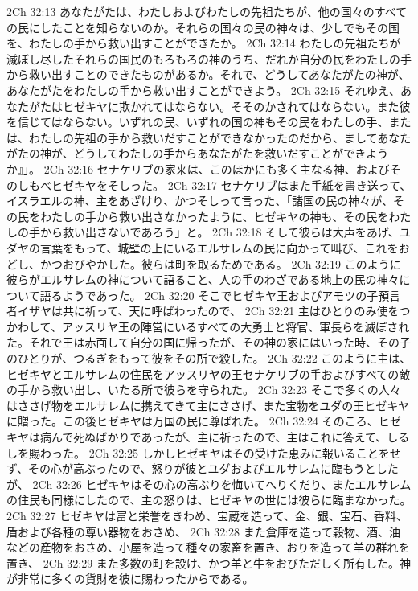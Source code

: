 2Ch 32:13  あなたがたは、わたしおよびわたしの先祖たちが、他の国々のすべての民にしたことを知らないのか。それらの国々の民の神々は、少しでもその国を、わたしの手から救い出すことができたか。
2Ch 32:14  わたしの先祖たちが滅ぼし尽したそれらの国民のもろもろの神のうち、だれか自分の民をわたしの手から救い出すことのできたものがあるか。それで、どうしてあなたがたの神が、あなたがたをわたしの手から救い出すことができよう。
2Ch 32:15  それゆえ、あなたがたはヒゼキヤに欺かれてはならない。そそのかされてはならない。また彼を信じてはならない。いずれの民、いずれの国の神もその民をわたしの手、または、わたしの先祖の手から救いだすことができなかったのだから、ましてあなたがたの神が、どうしてわたしの手からあなたがたを救いだすことができようか』」。
2Ch 32:16  セナケリブの家来は、このほかにも多く主なる神、およびそのしもべヒゼキヤをそしった。
2Ch 32:17  セナケリブはまた手紙を書き送って、イスラエルの神、主をあざけり、かつそしって言った、「諸国の民の神々が、その民をわたしの手から救い出さなかったように、ヒゼキヤの神も、その民をわたしの手から救い出さないであろう」と。
2Ch 32:18  そして彼らは大声をあげ、ユダヤの言葉をもって、城壁の上にいるエルサレムの民に向かって叫び、これをおどし、かつおびやかした。彼らは町を取るためである。
2Ch 32:19  このように彼らがエルサレムの神について語ること、人の手のわざである地上の民の神々について語るようであった。
2Ch 32:20  そこでヒゼキヤ王およびアモツの子預言者イザヤは共に祈って、天に呼ばわったので、
2Ch 32:21  主はひとりのみ使をつかわして、アッスリヤ王の陣営にいるすべての大勇士と将官、軍長らを滅ぼされた。それで王は赤面して自分の国に帰ったが、その神の家にはいった時、その子のひとりが、つるぎをもって彼をその所で殺した。
2Ch 32:22  このように主は、ヒゼキヤとエルサレムの住民をアッスリヤの王セナケリブの手およびすべての敵の手から救い出し、いたる所で彼らを守られた。
2Ch 32:23  そこで多くの人々はささげ物をエルサレムに携えてきて主にささげ、また宝物をユダの王ヒゼキヤに贈った。この後ヒゼキヤは万国の民に尊ばれた。
2Ch 32:24  そのころ、ヒゼキヤは病んで死ぬばかりであったが、主に祈ったので、主はこれに答えて、しるしを賜わった。
2Ch 32:25  しかしヒゼキヤはその受けた恵みに報いることをせず、その心が高ぶったので、怒りが彼とユダおよびエルサレムに臨もうとしたが、
2Ch 32:26  ヒゼキヤはその心の高ぶりを悔いてへりくだり、またエルサレムの住民も同様にしたので、主の怒りは、ヒゼキヤの世には彼らに臨まなかった。
2Ch 32:27  ヒゼキヤは富と栄誉をきわめ、宝蔵を造って、金、銀、宝石、香料、盾および各種の尊い器物をおさめ、
2Ch 32:28  また倉庫を造って穀物、酒、油などの産物をおさめ、小屋を造って種々の家畜を置き、おりを造って羊の群れを置き、
2Ch 32:29  また多数の町を設け、かつ羊と牛をおびただしく所有した。神が非常に多くの貨財を彼に賜わったからである。
